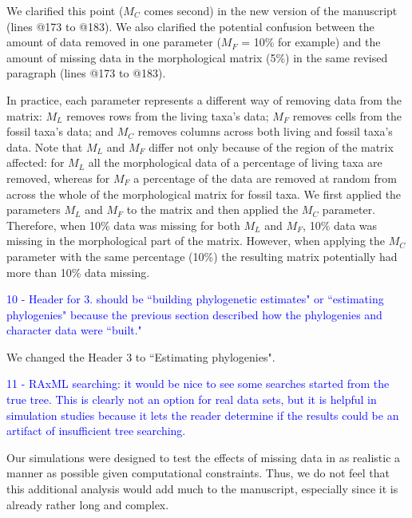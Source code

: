 \documentclass[11pt]{letter}
\begin{document}
\begin{letter}{}
We clarified this point ($M_C$ comes second) in the new version of the manuscript (lines @173 to @183). We also clarified the potential confusion between the amount of data removed in one parameter ($M_F$ = 10\% for example) and the amount of missing data in the morphological matrix (5\%) in the same revised paragraph (lines @173 to @183).

\hfill\begin{minipage}{\dimexpr\textwidth-1cm}
In practice, each parameter represents a different way of removing data from the matrix: $M_L$ removes rows from the living taxa's data; $M_F$ removes cells from the fossil taxa's data; and $M_C$ removes columns across both living and fossil taxa's data. Note that $M_L$ and $M_F$ differ not only because of the region of the matrix affected: for $M_L$ all the morphological data of a percentage of living taxa are removed, whereas for $M_F$ a percentage of the data are removed at random from across the whole of the morphological matrix for fossil taxa. We first applied the parameters $M_L$ and $M_F$ to the matrix and then applied the $M_C$ parameter. Therefore, when 10\% data was missing for both $M_L$ and $M_F$, 10\% data was missing in the morphological part of the matrix. However, when applying the $M_C$ parameter with the same percentage (10\%) the resulting matrix potentially had more than 10\% data missing.
\end{minipage}


\textcolor{blue}{10 - Header for 3. should be ``building phylogenetic estimates" or ``estimating phylogenies" because the previous section described how the phylogenies and character data were ``built."}

We changed the Header 3 to ``Estimating phylogenies".


\textcolor{blue}{11 - RAxML searching: it would be nice to see some searches started from the true tree. This is clearly not an option for real data sets, but it is helpful in simulation studies because it lets the reader determine if the results could be an artifact of insufficient tree searching.}

Our simulations were designed to test the effects of missing data in as realistic a manner as possible given computational constraints. Thus, we do not feel that this additional analysis would add much to the manuscript, especially since it is already rather long and complex. 


\end{letter}
\end{document}
